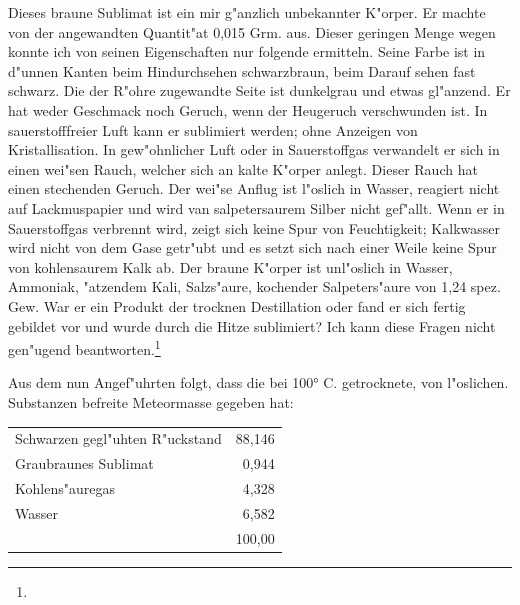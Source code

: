 \documentclass[a4paper, 11pt, oneside]{article}
\begin{document}
Dieses braune Sublimat ist ein mir g"anzlich unbekannter K"orper. Er machte von der angewandten Quantit"at 0,015 Grm. aus. Dieser geringen Menge wegen konnte ich von seinen Eigenschaften nur folgende ermitteln. Seine Farbe ist in d"unnen Kanten beim Hindurchsehen schwarzbraun, beim Darauf sehen fast schwarz. Die der R"ohre zugewandte Seite ist dunkelgrau und etwas gl"anzend. Er hat weder Geschmack noch Geruch, wenn der Heugeruch verschwunden ist. In sauerstofffreier Luft kann er sublimiert werden; ohne Anzeigen von Kristallisation. In gew"ohnlicher Luft oder in Sauerstoffgas verwandelt er sich in einen wei"sen Rauch, welcher sich an kalte K"orper anlegt. Dieser Rauch hat einen stechenden Geruch. Der wei"se Anflug ist l"oslich in Wasser, reagiert nicht auf Lackmuspapier und wird van salpetersaurem Silber nicht gef"allt. Wenn er in Sauerstoffgas verbrennt wird, zeigt sich keine Spur von Feuchtigkeit; Kalkwasser wird nicht von dem Gase getr"ubt und es setzt sich nach einer Weile keine Spur von kohlensaurem Kalk ab. Der braune K"orper ist unl"oslich in Wasser, Ammoniak, "atzendem Kali, Salzs"aure, kochender Salpeters"aure von 1,24 spez. Gew. War er ein Produkt der trocknen Destillation oder fand er sich fertig gebildet vor und wurde durch die Hitze sublimiert? Ich kann diese Fragen nicht gen"ugend beantworten.\footnote{}

Aus dem nun Angef"uhrten folgt, dass die bei 100° C. getrocknete, von l"oslichen. Substanzen befreite Meteormasse gegeben hat:
\begin{center}
\begin{tabular}{ l r }
    Schwarzen gegl"uhten R"uckstand & 88,146\\
    Graubraunes Sublimat & 0,944\\
    Kohlens"auregas & 4,328\\
    Wasser & 6,582\\
    & 100,00\\
\end{tabular}
\end{center}
\end{document}
